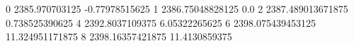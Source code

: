 0 2385.970703125 -0.77978515625
1 2386.75048828125 0.0
2 2387.489013671875 0.738525390625
4 2392.8037109375 6.05322265625
6 2398.075439453125 11.324951171875
8 2398.16357421875 11.4130859375
